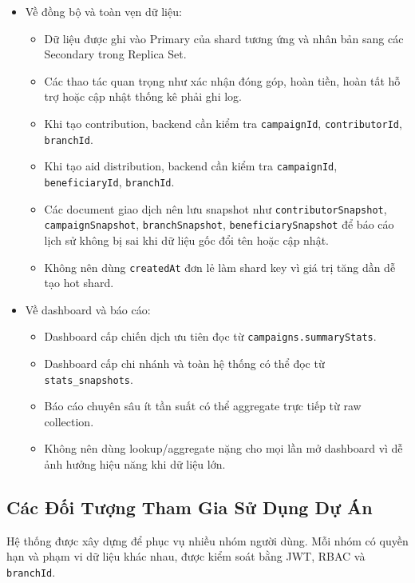 \documentclass[12pt,a4paper]{article}
\begin{document}
\begin{itemize}
\begin{itemize}
\item \textbf{Dữ liệu tình nguyện viên:} \texttt{volunteers}, kỹ năng, lịch rảnh, trạng thái và chiến dịch tham gia.
\item \textbf{Dữ liệu vận hành:} \texttt{activity\_logs}, health check, replication status, backup/restore log.
\item \textbf{Dữ liệu thống kê:} \texttt{campaigns.summaryStats} và \texttt{stats\_snapshots}.
\end{itemize}
\item Về đồng bộ và toàn vẹn dữ liệu:
\begin{itemize}
\item Dữ liệu được ghi vào Primary của shard tương ứng và nhân bản sang các Secondary trong Replica Set.
\item Các thao tác quan trọng như xác nhận đóng góp, hoàn tiền, hoàn tất hỗ trợ hoặc cập nhật thống kê phải ghi log.
\item Khi tạo contribution, backend cần kiểm tra \texttt{campaignId}, \texttt{contributorId}, \texttt{branchId}.
\item Khi tạo aid distribution, backend cần kiểm tra \texttt{campaignId}, \texttt{beneficiaryId}, \texttt{branchId}.
\item Các document giao dịch nên lưu snapshot như \texttt{contributorSnapshot}, \texttt{campaignSnapshot}, \texttt{branchSnapshot}, \texttt{beneficiarySnapshot} để báo cáo lịch sử không bị sai khi dữ liệu gốc đổi tên hoặc cập nhật.
\item Không nên dùng \texttt{createdAt} đơn lẻ làm shard key vì giá trị tăng dần dễ tạo hot shard.
\end{itemize}
\item Về dashboard và báo cáo:
\begin{itemize}
\item Dashboard cấp chiến dịch ưu tiên đọc từ \texttt{campaigns.summaryStats}.
\item Dashboard cấp chi nhánh và toàn hệ thống có thể đọc từ \texttt{stats\_snapshots}.
\item Báo cáo chuyên sâu ít tần suất có thể aggregate trực tiếp từ raw collection.
\item Không nên dùng lookup/aggregate nặng cho mọi lần mở dashboard vì dễ ảnh hưởng hiệu năng khi dữ liệu lớn.
\end{itemize}
\end{itemize}
\subsection{Các Đối Tượng Tham Gia Sử Dụng Dự Án}
Hệ thống được xây dựng để phục vụ nhiều nhóm người dùng. Mỗi nhóm có quyền hạn và phạm vi dữ liệu khác nhau, được kiểm soát bằng JWT, RBAC và \texttt{branchId}.
\end{document}
